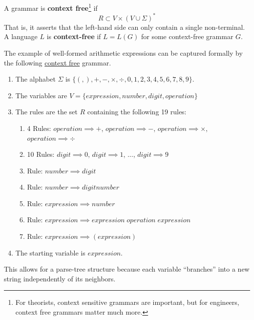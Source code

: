   \begin{definition}
    \label{def:context-free}
		A grammar is \textbf{context free}\footnote{For theorists, context sensitive grammars are important, but for engineers, context free grammars matter much more.} if 
    \begin{equation}
      R \subset V \times (V \cup \Sigma)^\ast
    \end{equation}
    That is, it asserts that the left-hand side can only contain a single non-terminal. A language $L$ is \textbf{context-free} if $L = L(G)$ for some context-free grammar $G$. 
  \end{definition}

  \begin{example}
    \label{ex:a-grammar-for-arithmetic-expressions}
		The example of well-formed arithmetic expressions can be captured formally by the following \hyperref[def:context-free]{context free} grammar. 
		\begin{enumerate}
			\item The alphabet $\Sigma$ is $\{(, ), +, -, \times, \div, 0, 1, 2, 3, 4, 5, 6, 7, 8, 9\}$. 
			\item The variables are $V = \{expression, number, digit, operation\}$
			\item The rules are the set $R$ containing the following 19 rules: 
			\begin{enumerate}
				\item 4 Rules: $operation \implies +$, $operation \implies -$, $operation \implies \times$, $operation \implies \div$
				\item 10 Rules: $digit \implies 0$, $digit \implies 1$, ..., $digit \implies 9$
				\item Rule: $number \implies digit$
				\item Rule: $number \implies digit number$
				\item Rule: $expression \implies number$
				\item Rule: $expression \implies expression\; operation\; expression$
				\item Rule: $expression \implies (expression)$
			\end{enumerate}
			\item The starting variable is $expression$.
		\end{enumerate}
  \end{example}

  This allows for a parse-tree structure because each variable ``branches'' into a new string independently of its neighbors. 

